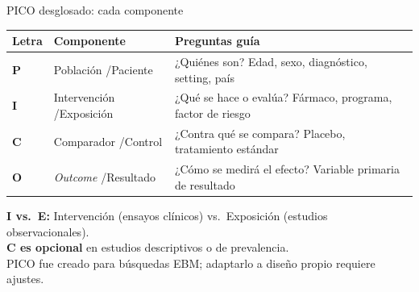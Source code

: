 \documentclass[12pt, aspectratio=169]{beamer}
\begin{document}
\begin{frame}{PICO desglosado: cada componente}
  \begin{tabular}{@{}p{} p{} p{}@{}}
    \toprule
    \textbf{Letra} & \textbf{Componente} & \textbf{Preguntas guía} \\
    \midrule
    \textbf{P} & Población /\newline Paciente & ¿Quiénes son? Edad, sexo, diagnóstico,
                                                 setting, país \\[1pt]
    \textbf{I} & Intervención /\newline Exposición & ¿Qué se hace o evalúa? Fármaco,
                                                      programa, factor de riesgo \\[1pt]
    \textbf{C} & Comparador /\newline Control & ¿Contra qué se compara? Placebo,
                                                tratamiento estándar \\[1pt]
    \textbf{O} & \textit{Outcome} /\newline Resultado & ¿Cómo se medirá el efecto?
                                                         Variable primaria de resultado \\
    \bottomrule
  \end{tabular}

  \vspace{2pt}
  \begin{warningbox}[Consideraciones]
    \footnotesize
    \textbf{I vs.\ E:} Intervención (ensayos clínicos) vs.\ Exposición (estudios observacionales).\\
    \textbf{C es opcional} en estudios descriptivos o de prevalencia.\\
    PICO fue creado para búsquedas EBM; adaptarlo a diseño propio requiere ajustes.
  \end{warningbox}
\end{frame}
\end{document}
